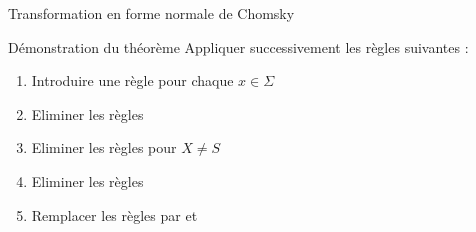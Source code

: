 \begin{frame}{Transformation en forme normale de Chomsky}\label{slide:FNC}

  \begin{block}{Démonstration du théorème}
    Appliquer successivement les règles suivantes :
    \begin{enumerate}
    \item Introduire une règle  pour chaque $x\in \Sigma$
    \item Eliminer les règles  
    \item Eliminer les règles  pour $X \not= S$
    \item Eliminer les règles 
    \item Remplacer les règles  par  et 
    \end{enumerate}
  \end{block}


\end{frame}
